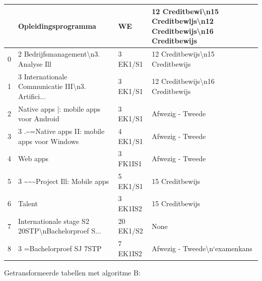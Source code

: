 \begin{tabular}{llll}
\toprule
{} &                                Opleidingsprogramma &         WE & 12 Creditbewi\textbackslash n15 Creditbewljs\textbackslash n12 Creditbewijs\textbackslash n16 Creditbewijs \\
\midrule
0 &               2 Bedrijfsmanagement\textbackslash n3. Analyse Ill &   3 EK1/S1 &                   12 Creditbewijs\textbackslash n15 Creditbewijs \\
1 &  3 Internationale Communicatie III\textbackslash n3. Artifici... &   3 EK1/S1 &                   12 Creditbewijs\textbackslash n16 Creditbewijs \\
2 &            Native apps |: mobile apps voor Android &   3 EK1/S1 &                                   Afwezig - Tweede \\
3 &      3 .\textasciitilde =Native apps II: mobile apps voor Windows &   4 EK1/S1 &                                   Afwezig - Tweede \\
4 &                                           Web apps &   3 FK1IS1 &                                   Afwezig - Tweede \\
5 &                     3 \textasciitilde \textasciitilde  \textasciitilde Project Ill: Mobile apps &   5 EK1/S1 &                                    15 Creditbewijs \\
6 &                                             Talent &   3 EK1IS2 &                                    15 Creditbewijs \\
7 &  Internationale stage S2 20STP\textbackslash nBachelorproef S... &  20 EK1/S2 &                                               None \\
8 &                          3  =Bachelorproef SJ 7STP &   7 EK1IS2 &                      Afwezig - Tweede\textbackslash n‘examenkans \\
\bottomrule
\end{tabular}

Getransformeerde tabellen met algoritme B:

